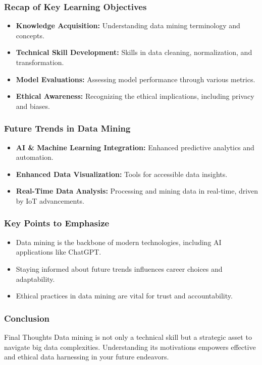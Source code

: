 \documentclass[aspectratio=169]{beamer}
\begin{document}
\begin{frame}[fragile]
    \frametitle{Recap of Key Learning Objectives}
    \begin{itemize}
        \item \textbf{Knowledge Acquisition:} Understanding data mining terminology and concepts.
        \item \textbf{Technical Skill Development:} Skills in data cleaning, normalization, and transformation.
        \item \textbf{Model Evaluations:} Assessing model performance through various metrics.
        \item \textbf{Ethical Awareness:} Recognizing the ethical implications, including privacy and biases.
    \end{itemize}
\end{frame}

\begin{frame}[fragile]
    \frametitle{Future Trends in Data Mining}
    \begin{itemize}
        \item \textbf{AI \& Machine Learning Integration:} Enhanced predictive analytics and automation.
        \item \textbf{Enhanced Data Visualization:} Tools for accessible data insights.
        \item \textbf{Real-Time Data Analysis:} Processing and mining data in real-time, driven by IoT advancements.
    \end{itemize}
\end{frame}

\begin{frame}[fragile]
    \frametitle{Key Points to Emphasize}
    \begin{itemize}
        \item Data mining is the backbone of modern technologies, including AI applications like ChatGPT.
        \item Staying informed about future trends influences career choices and adaptability.
        \item Ethical practices in data mining are vital for trust and accountability.
    \end{itemize}
\end{frame}

\begin{frame}[fragile]
    \frametitle{Conclusion}
    \begin{block}{Final Thoughts}
        Data mining is not only a technical skill but a strategic asset to navigate big data complexities. Understanding its motivations empowers effective and ethical data harnessing in your future endeavors.
    \end{block}
\end{frame}
\end{document}
